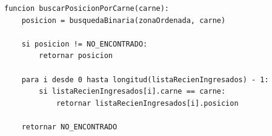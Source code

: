 \begin{lstlisting}[style=pseudocodigo]
funcion buscarPosicionPorCarne(carne):
    posicion = busquedaBinaria(zonaOrdenada, carne)

    si posicion != NO_ENCONTRADO:
        retornar posicion

    para i desde 0 hasta longitud(listaRecienIngresados) - 1:
        si listaRecienIngresados[i].carne == carne:
            retornar listaRecienIngresados[i].posicion

    retornar NO_ENCONTRADO
\end{lstlisting}
